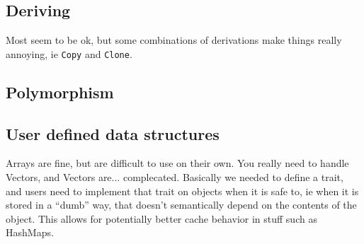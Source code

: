 \documentclass[12pt,final]{article}
\begin{document}
\subsection{Deriving}
Most seem to be ok, but some combinations of derivations make things really
annoying, ie \texttt{Copy} and \texttt{Clone}.

\subsection{Polymorphism}

\subsection{User defined data structures}
Arrays are fine, but are difficult to use on their own. You really need to
handle Vectors, and Vectors are... complecated. Basically we needed to define a
trait, and users need to implement that trait on objects when it is safe to, ie
when it is stored in a ``dumb'' way, that doesn't semantically depend on the
contents of the object. This allows for potentially better cache behavior in
stuff such as HashMaps.
\end{document}
